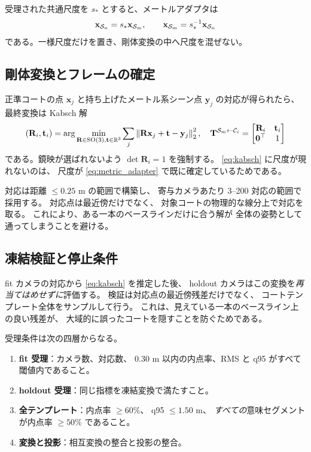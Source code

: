 

受理された共通尺度を \(s_*\) とすると、メートルアダプタは
\begin{equation}
  \mathbf{x}_{\mathcal{S}_n}=s_*\mathbf{x}_{\mathcal{S}_m},\qquad
  \mathbf{x}_{\mathcal{S}_m}=s_*^{-1}\mathbf{x}_{\mathcal{S}_n}
  \label{eq:metric_adapter}
\end{equation}
である。一様尺度だけを置き、剛体変換の中へ尺度を混ぜない。

\subsection{剛体変換とフレームの確定}
\label{sec:kabsch}

正準コートの点 \(\mathbf{x}_j\) と持ち上げたメートル系シーン点
\(\mathbf{y}_j\) の対応が得られたら、最終変換は Kabsch 解
\begin{equation}
  (\mathbf{R}_i,\mathbf{t}_i)=
  \arg\min_{\mathbf{R}\in\mathrm{SO}(3),\mathbf{t}\in\mathbb{R}^3}
    \sum_j \left\|\mathbf{R}\mathbf{x}_j+\mathbf{t}-\mathbf{y}_j\right\|_2^2,
  \quad
  \mathbf{T}^{\mathcal{S}_m\leftarrow \mathcal{C}_i}=
  \begin{bmatrix}\mathbf{R}_i&\mathbf{t}_i\\\mathbf{0}^{\top}&1\end{bmatrix}
  \label{eq:kabsch}
\end{equation}
である。鏡映が選ばれないよう \(\det\mathbf{R}_i=1\) を強制する。
\cref{eq:kabsch} に尺度が現れないのは、
尺度が \cref{eq:metric_adapter} で既に確定しているためである。

対応は距離 \(\leq 0.25\) m の範囲で構築し、
寄与カメラあたり 3--200 対応の範囲で採用する。
対応点は最近傍だけでなく、
対象コートの物理的な線分上で対応を取る。
これにより、ある一本のベースラインだけに合う解が
全体の姿勢として通ってしまうことを避ける。

\subsection{凍結検証と停止条件}
\label{sec:holdout}

fit カメラの対応から \cref{eq:kabsch} を推定した後、
holdout カメラはこの変換を\emph{再当てはめせずに}評価する。
検証は対応点の最近傍残差だけでなく、
コートテンプレート全体をサンプルして行う。
これは、見えている一本のベースライン上の良い残差が、
大域的に誤ったコートを隠すことを防ぐためである。

受理条件は次の四層からなる。

\begin{enumerate}[leftmargin=1.6em]
  \item \textbf{fit 受理}：カメラ数、対応数、
  \(0.30\) m 以内の内点率、RMS と q95 がすべて閾値内であること。
  \item \textbf{holdout 受理}：同じ指標を凍結変換で満たすこと。
  \item \textbf{全テンプレート}：内点率 \(\geq 60\%\)、
  q95 \(\leq 1.50\) m、
  \emph{すべての}意味セグメントが内点率 \(\geq 50\%\) であること。
  \item \textbf{変換と投影}：相互変換の整合と投影の整合。
\end{enumerate}


